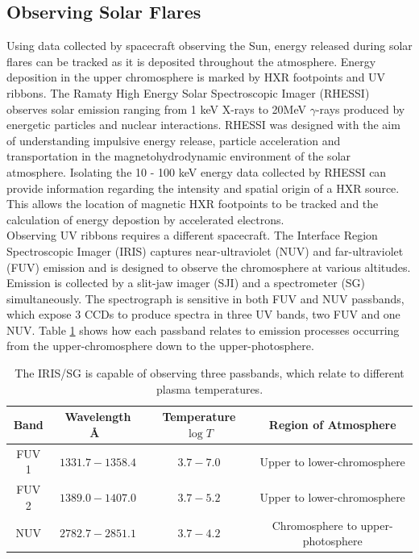 \subsection{Observing Solar Flares}
Using data collected by spacecraft observing the Sun, energy released during solar flares can be tracked as it is deposited throughout the atmosphere. Energy deposition in the upper chromosphere is marked by HXR footpoints and UV ribbons. The Ramaty High Energy Solar Spectroscopic Imager (RHESSI) observes solar emission ranging from 1 keV X-rays to 20MeV $\gamma$-rays produced by energetic particles and nuclear interactions. RHESSI was designed with the aim of understanding impulsive energy release, particle acceleration and transportation in the magnetohydrodynamic environment of the solar atmosphere. Isolating the 10 - 100 keV energy data collected by RHESSI can provide information regarding the intensity and spatial origin of a HXR source. This allows the location of magnetic HXR footpoints to be tracked and the calculation of energy depostion by accelerated electrons.
\\
Observing UV ribbons requires a different spacecraft. The Interface Region Spectroscopic Imager (IRIS) captures near-ultraviolet (NUV) and far-ultraviolet (FUV) emission and is designed to observe the chromosphere at various altitudes. Emission is collected by a slit-jaw imager (SJI) and a spectrometer (SG) simultaneously. The spectrograph is sensitive in both FUV and NUV passbands, which expose 3 CCDs to produce spectra in three UV bands, two FUV and one NUV. Table \ref{iris-sg} shows how each passband relates to emission processes occurring from the upper-chromosphere down to the upper-photosphere.

\begin{table}[H]
\centering
\begin{tabular}{|c|c|c|c|}
Band & Wavelength \AA\ & Temperature $\log{T}$ & Region of Atmosphere\\
\hline
FUV 1 & $1331.7 - 1358.4$ & $3.7 - 7.0$ & Upper to lower-chromosphere\\
FUV 2 & $1389.0 - 1407.0$ & $3.7 - 5.2$ & Upper to lower-chromosphere\\
NUV & $2782.7 - 2851.1$ & $3.7 - 4.2$ & Chromosphere to upper-photosphere\\
\end{tabular}
\caption{The IRIS/SG is capable of observing three passbands, which relate to different plasma temperatures.}\label{iris-sg}
\end{table}

